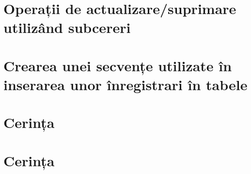 \documentclass[a4paper, oneside, 12pt]{article}
\begin{document}
\begin{center}

\minipage{\linewidth}

\endminipage

\minipage{\linewidth}

\endminipage

\minipage{\linewidth}

\endminipage

\minipage{\linewidth}

\endminipage

\minipage{\linewidth}

\endminipage

\end{center}

\section{Operații de actualizare/suprimare utilizând subcereri}

\minipage{\linewidth}

\endminipage

\section{Crearea unei secvențe utilizate în inserarea unor înregistrari în tabele}

\minipage{\linewidth}

\endminipage

\section{Cerința}
\section{Cerința}
\end{document}
